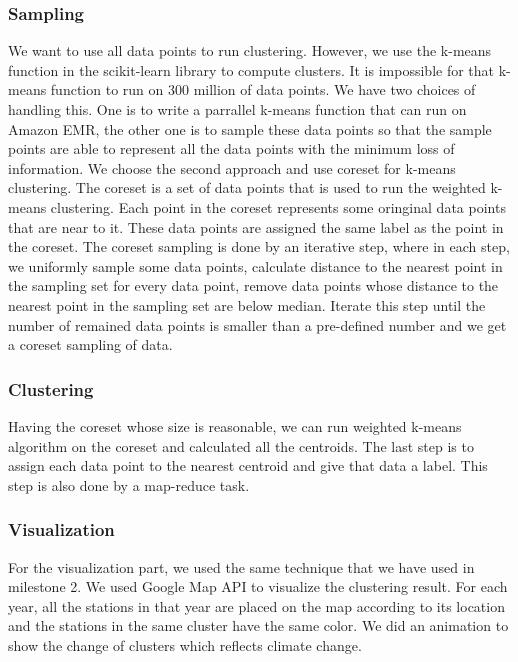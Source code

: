 \subsubsection{Sampling}
We want to use all data points to run clustering. However, we use the k-means function in the scikit-learn library to compute clusters. It is impossible for that k-means function to run on 300 million of data points. We have two choices of handling this. One is to write a parrallel k-means function that can run on Amazon EMR, the other one is to sample these data points so that the sample points are able to represent all the data points with the minimum loss of information. We choose the second approach and use coreset for k-means clustering. The coreset is a set of data points that is used to run the weighted k-means clustering. Each point in the coreset represents some oringinal data points that are near to it. These data points are assigned the same label as the point in the coreset. The coreset sampling is done by an iterative step, where in each step, we uniformly sample some data points, calculate distance to the nearest point in the sampling set for every data point, remove data points whose distance to the nearest point in the sampling set are below median. Iterate this step until the number of remained data points is smaller than a pre-defined number and we get a coreset sampling of data.

\subsubsection{Clustering}
Having the coreset whose size is reasonable, we can run weighted k-means algorithm on the coreset and calculated all the centroids. The last step is to assign each data point to the nearest centroid and give that data a label. This step is also done by a map-reduce task.

\subsubsection{Visualization}
For the visualization part, we used the same technique that we have used in milestone 2. We used Google Map API to visualize the clustering result. For each year, all the stations in that year are placed on the map according to its location and the stations in the same cluster have the same color. We did an animation to show the change of clusters which reflects climate change.


